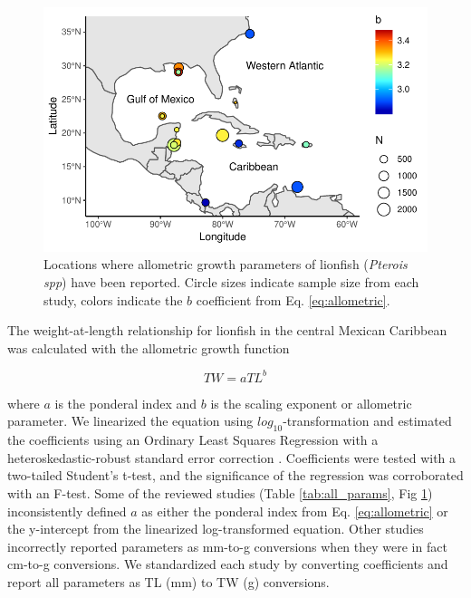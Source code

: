 \documentclass[fleqn,10pt,lineno]{wlpeerj} %
\begin{document}
\begin{figure}
\centering
\includegraphics{Manuscript_files/figure-latex/map-1.pdf}
\caption{\label{fig:map}Locations where allometric growth parameters of
lionfish (\emph{Pterois spp}) have been reported. Circle sizes indicate
sample size from each study, colors indicate the \(b\) coefficient from
Eq. \ref{eq:allometric}.}
\end{figure}

The weight-at-length relationship for lionfish in the central Mexican
Caribbean was calculated with the allometric growth function

\begin{equation}
\label{eq:allometric}
TW = aTL^b
\end{equation}

where \(a\) is the ponderal index and \(b\) is the scaling exponent or
allometric parameter. We linearized the equation using
\(log_{10}\)-transformation and estimated the coefficients using an
Ordinary Least Squares Regression with a heteroskedastic-robust standard
error correction \citep{zeileis_2004}. Coefficients were tested with a
two-tailed Student's t-test, and the significance of the regression was
corroborated with an F-test. Some of the reviewed studies (Table
\ref{tab:all_params}, Fig \ref{fig:map}) inconsistently defined \(a\) as
either the ponderal index from Eq. \ref{eq:allometric} or the
y-intercept from the linearized log-transformed equation. Other studies
incorrectly reported parameters as mm-to-g conversions when they were in
fact cm-to-g conversions. We standardized each study by converting
coefficients and report all parameters as TL (mm) to TW (g) conversions.
\end{document}
